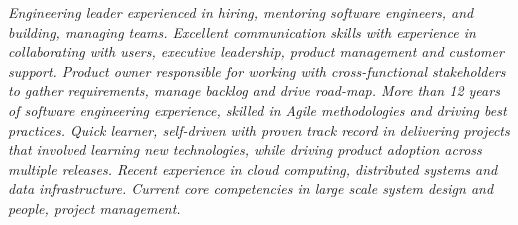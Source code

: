 {\selectfont
\begin{justify}\textit{Engineering leader experienced in hiring, mentoring software engineers, and building, managing teams. Excellent communication skills with experience in collaborating with users, executive leadership, product management and customer support. Product owner responsible for working with cross-functional stakeholders to gather requirements, manage backlog and drive road-map. More than 12 years of software engineering experience, skilled in Agile methodologies and driving best practices. Quick learner, self-driven with proven track record in delivering projects that involved learning new technologies, while driving product adoption across multiple releases. Recent experience in cloud computing, distributed systems and data infrastructure. Current core competencies in large scale system design and people, project management.}\end{justify}
}